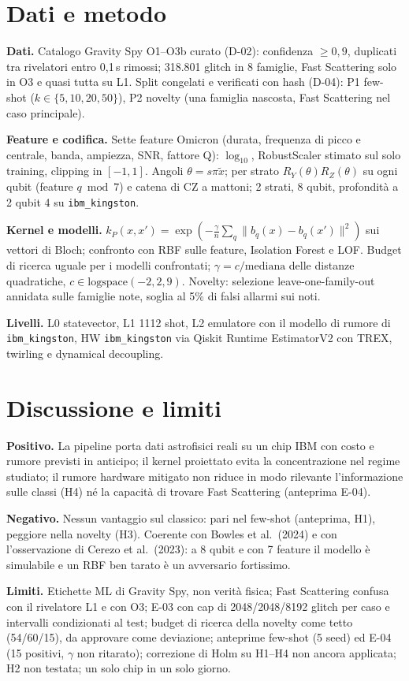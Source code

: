 \documentclass[11pt,a4paper]{article}
\begin{document}
\section{Dati e metodo}
\textbf{Dati.} Catalogo Gravity Spy O1--O3b curato (D-02): confidenza $\geq0{,}9$, duplicati tra rivelatori entro
0,1\,s rimossi; 318.801 glitch in 8 famiglie, Fast Scattering solo in O3 e quasi tutta su L1. Split congelati e
verificati con hash (D-04): P1 few-shot ($k\in\{5,10,20,50\}$), P2 novelty (una famiglia nascosta, Fast Scattering
nel caso principale).

\textbf{Feature e codifica.} Sette feature Omicron (durata, frequenza di picco e centrale, banda, ampiezza, SNR,
fattore Q): $\log_{10}$, RobustScaler stimato sul solo training, clipping in $[-1,1]$. Angoli $\theta=s\pi\tilde x$;
per strato $R_Y(\theta)R_Z(\theta)$ su ogni qubit (feature $q\bmod7$) e catena di CZ a mattoni; 2 strati, 8 qubit,
profondità a 2 qubit 4 su \texttt{ibm\_kingston}.

\textbf{Kernel e modelli.} $k_P(x,x')=\exp(-\tfrac{\gamma}{n}\sum_q\lVert b_q(x)-b_q(x')\rVert^2)$ sui vettori di Bloch;
confronto con RBF sulle feature, Isolation Forest e LOF. Budget di ricerca uguale per i modelli confrontati;
$\gamma=c/\text{mediana}$ delle distanze quadratiche, $c\in\mathrm{logspace}(-2,2,9)$. Novelty: selezione
leave-one-family-out annidata sulle famiglie note, soglia al 5\% di falsi allarmi sui noti.

\textbf{Livelli.} L0 statevector, L1 1112 shot, L2 emulatore con il modello di rumore di \texttt{ibm\_kingston}, HW
\texttt{ibm\_kingston} via Qiskit Runtime EstimatorV2 con TREX, twirling e dynamical decoupling.



\section{Discussione e limiti}
\textbf{Positivo.} La pipeline porta dati astrofisici reali su un chip IBM con costo e rumore previsti in anticipo;
il kernel proiettato evita la concentrazione nel regime studiato; il rumore hardware mitigato non riduce in modo
rilevante l’informazione sulle classi (H4) né la capacità di trovare Fast Scattering (anteprima E-04).

\textbf{Negativo.} Nessun vantaggio sul classico: pari nel few-shot (anteprima, H1), peggiore nella novelty (H3).
Coerente con Bowles et al.\ (2024) e con l’osservazione di Cerezo et al.\ (2023): a 8 qubit e con 7 feature il modello
è simulabile e un RBF ben tarato è un avversario fortissimo.

\textbf{Limiti.} Etichette ML di Gravity Spy, non verità fisica; Fast Scattering confusa con il rivelatore L1 e con O3;
E-03 con cap di 2048/2048/8192 glitch per caso e intervalli condizionati al test; budget di ricerca della novelty come
tetto (54/60/15), da approvare come deviazione; anteprime few-shot (5 seed) ed E-04 (15 positivi, $\gamma$ non
ritarato); correzione di Holm su H1--H4 non ancora applicata; H2 non testata; un solo chip in un solo giorno.

\appendix

\end{document}
